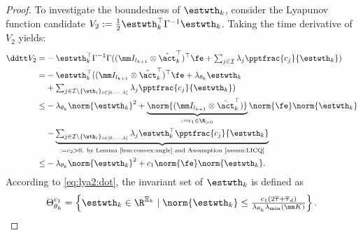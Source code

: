 \documentclass[final,5p,times,twocolumn,authoryear]{elsarticle}
\begin{document}
\begin{proof}
To investigate the boundedness of $\estwth_k$, consider the Lyapunov function candidate $V_2:=\tfrac{1}{2}\estwth_k^\top\Gamma^{-1} \estwth_k$.
Taking the time derivative of $V_2$ yields:
\begin{equation}
    \begin{aligned}
        \ddtt  V_2 
        =& 
        -\estwth_k^\top 
        \Gamma^{-1}\Gamma
        (
            (\mm I_{l_{k+1}}\otimes \hat\act_k^\top)^\top
            \fe
            +
            \textstyle\sum_{j\in\mathcal{I}}
            \lambda_j 
            \pptfrac{c_j}{\estwth_k}
        )
        \\
        =&
        -\estwth_k^\top 
        (
            (\mm I_{l_{k+1}}\otimes \hat\act_k^\top)^\top
            \fe
            +
            \lambda_{\theta_k}\estwth_k
        \\
        &
            +
            \textstyle\sum_{
                j\in\mathcal{I}\setminus \{\wth_i\}_{i\in[0,\cdots,k]}
            }
            \lambda_j 
            \pptfrac{c_j}{\estwth_k}
        )
        \\
        \le&
        -
        \lambda_{\theta_k}\norm{\estwth_k}^2
        +
        \underbrace{
            \norm{(\mm I_{l_{k+1}}\otimes \hat\act_k^\top)}
        }_{:=c_1\in\R_{>0}}
        \norm{\fe}
        \norm{\estwth_k}
        \\
        &
        -
        \underbrace{
        \textstyle\sum_{
            j\in\mathcal{I}\setminus \{\wth_i\}_{i\in[0,\cdots,k]}
        }
        \lambda_j 
        \estwth_k^\top \pptfrac{c_j}{\estwth_k}
        }_{:= c_2 >0,\ \text{by Lemma \ref{lem:convex:angle} and Assumption \ref{assum:LICQ}}}
        \\
        \le&
        -
        \lambda_{\theta_k}\norm{\estwth_k}^2
        +
        c_1     
        \norm{\fe}
        \norm{\estwth_k}
        .
    \end{aligned}
    \label{eq:lya2:dot}
\end{equation}
According to \eqref{eq:lya2:dot}, the invariant set of $\estwth_k$ is defined as
\begin{equation}
    \Theta_{\theta_k}^{c_1} 
    = 
    \left\{ 
        \estwth_k \in \R^{\Xi_{k}} 
        \mid 
        \norm{\estwth_k} 
        \le 
        \tfrac{
            c_1(2\overline\tau+\overline\tau_d)
        }{
            \lambda_{\theta_k}\lambda_{\min}(\mm K)
        }
    \right\}
    .
    \label{eq:invariant:c1:wth}
\end{equation}


\end{proof}
\end{document}
